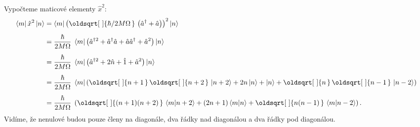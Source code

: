 \documentclass[10pt,a4paper]{article}
\renewcommand*{\sqrt}[2][\ ]{\oldsqrt[#1]{#2\,}\,}
\newcommand{\bra}[1]{\left< #1 \right|}
\newcommand{\ket}[1]{\left| #1 \right>}
\newcommand{\braket}[2]{\left< #1 \middle| #2 \right>}
\begin{document}
Vypočteme maticové elementy $\hat{x}^2$:
\begin{align*}
    \bra{m} \hat{x}^2 \ket{n}
    &= \bra{m} \left(
        \sqrt{\hbar / 2 M \Omega}
        \left( \hat{a}^\dagger + \hat{a} \right)
    \right)^2 \ket{n}
    \\[5pt]
    &= \frac{\hbar}{2 M \Omega} \; \bra{m} \left(
        \hat{a}^{\dagger 2} + \hat{a}^\dagger \hat{a} + \hat{a} \hat{a}^\dagger + \hat{a}^2
    \right) \ket{n}
    \\[5pt]
    &= \frac{\hbar}{2 M \Omega} \; \bra{m} \left(
        \hat{a}^{\dagger 2} + 2\hat{n} + \hat{1} + \hat{a}^2
    \right) \ket{n}
    \\[5pt]
    &= \frac{\hbar}{2 M \Omega} \; \bra{m} \left(
        \sqrt{n+1}\sqrt{n+2}\ket{n+2} + 2n\ket{n} + \ket{n} + \sqrt{n}\sqrt{n-1}\ket{n-2}
    \right)
    \\[5pt]
    &= \frac{\hbar}{2 M \Omega} \; \left(
        \sqrt{(n+1)(n+2)} \braket{m}{n+2} +
        (2n+1) \braket{m}{n} +
        \sqrt{n(n-1)} \braket{m}{n-2}
    \right).
\end{align*}
Vidíme, že nenulové budou pouze členy na diagonále, dva řádky nad diagonálou a dva řádky pod diagonálou.
\end{document}
